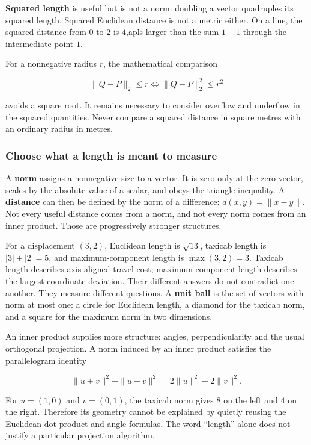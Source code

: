 \textbf{Squared length} is useful but is not a norm: doubling a vector quadruples its squared length. Squared Euclidean distance is not a metric either. On a line, the squared distance from \(0\) to \(2\) is \(4\),apls larger than the sum \(1+1\) through the intermediate point \(1\).

For a nonnegative radius \(r\), the mathematical comparison

\[
\|Q-P\|_2\le r
\iff\|Q-P\|_2^2\le r^2
\]

avoids a square root. It remains necessary to consider overflow and underflow in the squared quantities. Never compare a squared distance in square metres with an ordinary radius in metres.

\subsubsection{Choose what a length is meant to measure}\label{01-foundations-i-ch017-choose-what-a-length-is-meant-to-measure}

\hypertarget{01-foundations-i-ch017-choose-what-a-length-is-meant-to-measure}{}

A \textbf{norm} assigns a nonnegative size to a vector. It is zero only at the zero vector, scales by the absolute value of a scalar, and obeys the triangle inequality. A \textbf{distance} can then be defined by the norm of a difference: \(d(x,y)=\|x-y\|\). Not every useful distance comes from a norm, and not every norm comes from an inner product. Those are progressively stronger structures.

For a displacement \((3,2)\), Euclidean length is \(\sqrt{13}\), taxicab length is \(|3|+|2|=5\), and maximum-component length is \(\max(3,2)=3\). Taxicab length describes axis-aligned travel cost; maximum-component length describes the largest coordinate deviation. Their different answers do not contradict one another. They measure different questions. A \textbf{unit ball} is the set of vectors with norm at most one: a circle for Euclidean length, a diamond for the taxicab norm, and a square for the maximum norm in two dimensions.

An inner product supplies more structure: angles, perpendicularity and the usual orthogonal projection. A norm induced by an inner product satisfies the parallelogram identity

\[
\|u+v\|^2+\|u-v\|^2=2\|u\|^2+2\|v\|^2.
\]

For \(u=(1,0)\) and \(v=(0,1)\), the taxicab norm gives \(8\) on the left and \(4\) on the right. Therefore its geometry cannot be explained by quietly reusing the Euclidean dot product and angle formulas. The word ``length'' alone does not justify a particular projection algorithm.

